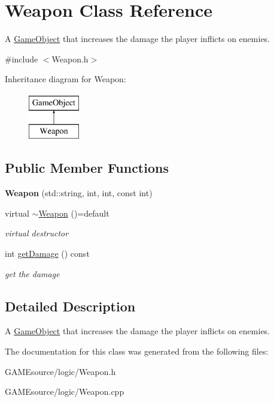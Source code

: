 \hypertarget{class_weapon}{}\section{Weapon Class Reference}
\label{class_weapon}


A \mbox{\hyperlink{class_game_object}{Game\+Object}} that increases the damage the player inflicts on enemies.  




{\ttfamily \#include $<$Weapon.\+h$>$}

Inheritance diagram for Weapon\+:\begin{figure}[H]
\begin{center}
\leavevmode
\includegraphics[height=2.000000cm]{class_weapon}
\end{center}
\end{figure}
\subsection*{Public Member Functions}
\begin{DoxyCompactItemize}
\item 
\mbox{\label{class_weapon_ac9a601e90cca06bb999effa0f6f722c0}} 
{\bfseries Weapon} (std\+::string, int, int, const int)
\item 
\mbox{\label{class_weapon_af06462587d8fd8878be4af2a2479f9bb}} 
virtual \mbox{\hyperlink{class_weapon_af06462587d8fd8878be4af2a2479f9bb}{$\sim$\+Weapon}} ()=default
\begin{DoxyCompactList}\small\item\em virtual destructor \end{DoxyCompactList}\item 
\mbox{\label{class_weapon_a5f1941efbf38c5719cf75e4a138e92d4}} 
int \mbox{\hyperlink{class_weapon_a5f1941efbf38c5719cf75e4a138e92d4}{get\+Damage}} () const
\begin{DoxyCompactList}\small\item\em get the damage \end{DoxyCompactList}\end{DoxyCompactItemize}


\subsection{Detailed Description}
A \mbox{\hyperlink{class_game_object}{Game\+Object}} that increases the damage the player inflicts on enemies. 

The documentation for this class was generated from the following files\+:\begin{DoxyCompactItemize}
\item 
G\+A\+M\+Esource/logic/Weapon.\+h\item 
G\+A\+M\+Esource/logic/Weapon.\+cpp\end{DoxyCompactItemize}

